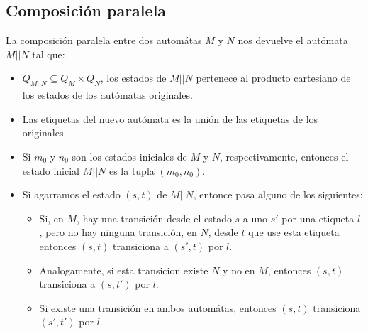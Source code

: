 \subsection{Composición paralela}
La composición paralela entre dos automátas $M$ y $N$ nos devuelve el autómata $M || N$ tal que:
\begin{itemize}
\item $Q_{M||N} \subseteq Q_M \times Q_N$, los estados de $M || N$ pertenece al producto cartesiano de los estados de los autómatas originales.
\item Las etiquetas del nuevo autómata es la unión de las etiquetas de los originales.
\item Si $m_0$ y $n_0$ son los estados iniciales de $M$ y $N$, respectivamente, entonces el estado inicial $M || N$ es la tupla $(m_0, n_0)$.
\item Si agarramos el estado $(s,t)$ de $M||N$, entonce pasa alguno de los siguientes:
\begin{itemize}
\item Si, en $M$, hay una transición desde el estado $s$ a uno $s'$ por una etiqueta $l$, pero no hay ninguna transición, en $N$, desde $t$ que use esta etiqueta entonces $(s, t)$ transiciona a $(s', t)$ por $l$.
\item Analogamente, si esta transicion existe $N$ y no en $M$, entonces $(s,t)$ transiciona a $(s,t')$ por $l$.
\item Si existe una transición en ambos automátas, entonces $(s,t)$ transiciona $(s', t')$ por $l$.
\end{itemize}
\end{itemize} 

